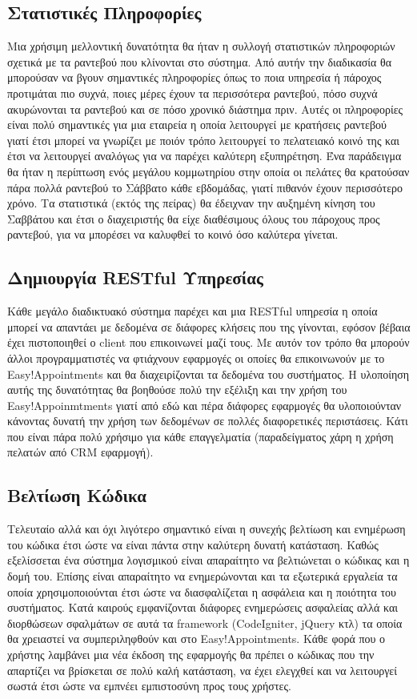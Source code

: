 \subsection{Στατιστικές Πληροφορίες} 
Μια χρήσιμη μελλοντική δυνατότητα θα ήταν η συλλογή στατιστικών πληροφοριών σχετικά με τα ραντεβού που κλίνονται στο σύστημα. Από αυτήν την διαδικασία θα μπορούσαν να βγουν σημαντικές πληροφορίες όπως το ποια υπηρεσία ή πάροχος προτιμάται πιο συχνά, ποιες μέρες έχουν τα περισσότερα ραντεβού, πόσο συχνά ακυρώνονται τα ραντεβού και σε πόσο χρονικό διάστημα πριν. Αυτές οι πληροφορίες είναι πολύ σημαντικές για μια εταιρεία η οποία λειτουργεί με κρατήσεις ραντεβού γιατί έτσι μπορεί να γνωρίζει με ποιόν τρόπο λειτουργεί το πελατειακό κοινό της και έτσι να λειτουργεί αναλόγως για να παρέχει καλύτερη εξυπηρέτηση. Ένα παράδειγμα θα ήταν η περίπτωση ενός μεγάλου κομμωτηρίου στην οποία οι πελάτες θα κρατούσαν πάρα πολλά ραντεβού το Σάββατο κάθε εβδομάδας, γιατί πιθανόν έχουν περισσότερο χρόνο. Τα στατιστικά (εκτός της πείρας) θα έδειχναν την αυξημένη κίνηση του Σαββάτου και έτσι ο διαχειριστής θα είχε διαθέσιμους όλους του πάροχους προς ραντεβού, για να μπορέσει να καλυφθεί το κοινό όσο καλύτερα γίνεται.

\subsection{Δημιουργία RESTful Υπηρεσίας}
Κάθε μεγάλο διαδικτυακό σύστημα παρέχει και μια RESTful υπηρεσία η οποία μπορεί να απαντάει με δεδομένα σε διάφορες κλήσεις που της γίνονται, εφόσον βέβαια έχει πιστοποιηθεί ο client που επικοινωνεί μαζί τους. Με αυτόν τον τρόπο θα μπορούν άλλοι προγραμματιστές να φτιάχνουν εφαρμογές οι οποίες θα επικοινωνούν με το Easy!Appointments και θα διαχειρίζονται τα δεδομένα του συστήματος. Η υλοποίηση αυτής της δυνατότητας θα βοηθούσε πολύ την εξέλιξη και την χρήση του Easy!Appoinmtments γιατί από εδώ και πέρα διάφορες εφαρμογές θα υλοποιούνταν κάνοντας δυνατή την χρήση των δεδομένων σε πολλές διαφορετικές περιστάσεις. Κάτι που είναι πάρα πολύ χρήσιμο για κάθε επαγγελματία (παραδείγματος χάρη η χρήση πελατών από CRM εφαρμογή).

\subsection{Βελτίωση Κώδικα}
Τελευταίο αλλά και όχι λιγότερο σημαντικό είναι η συνεχής βελτίωση και ενημέρωση του κώδικα έτσι ώστε να είναι πάντα στην καλύτερη δυνατή κατάσταση. Καθώς εξελίσσεται ένα σύστημα λογισμικού είναι απαραίτητο να βελτιώνεται ο κώδικας και η δομή του. Επίσης είναι απαραίτητο να ενημερώνονται και τα εξωτερικά εργαλεία τα οποία χρησιμοποιούνται έτσι ώστε να διασφαλίζεται η ασφάλεια και η ποιότητα του συστήματος. Κατά καιρούς εμφανίζονται διάφορες ενημερώσεις ασφαλείας αλλά και διορθώσεων σφαλμάτων σε αυτά τα framework (CodeIgniter, jQuery κτλ) τα οποία θα χρειαστεί να συμπεριληφθούν και στο Easy!Appointments. Κάθε φορά που ο χρήστης λαμβάνει μια νέα έκδοση της εφαρμογής θα πρέπει ο κώδικας που την απαρτίζει να βρίσκεται σε πολύ καλή κατάσταση, να έχει ελεγχθεί και να λειτουργεί σωστά έτσι ώστε να εμπνέει εμπιστοσύνη προς τους χρήστες. 